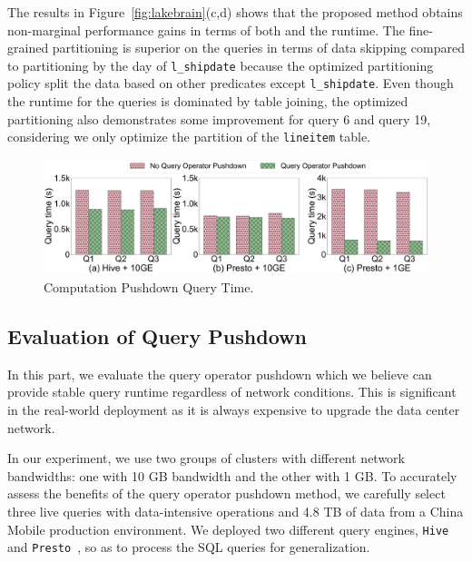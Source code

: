 The results  in Figure~\ref{fig:lakebrain}(c,d) shows that the proposed method obtains non-marginal performance gains in terms of both  and the runtime. The fine-grained partitioning is superior on the queries in terms of data skipping compared to partitioning by the day of \texttt{l\_shipdate} because the optimized partitioning policy split the data based on other predicates except \texttt{l\_shipdate}. Even though the runtime for the queries is dominated by table joining, the optimized partitioning also demonstrates some improvement for query 6 and query 19, considering we only optimize the partition of the \texttt{lineitem} table. 



\begin{figure}
	\centering
	\includegraphics[width=\columnwidth]{figures/Querytime}
	\caption{Computation Pushdown Query Time.}
	\label{fig:pushdown}
\end{figure}



\subsection{Evaluation of Query Pushdown}
In this part, we evaluate the query operator pushdown  which we believe can provide stable query runtime regardless of network conditions. This is significant in the real-world deployment as it is  always expensive to upgrade the data center network. 




In our experiment, we use two groups of clusters with different network bandwidths: one with 10 GB bandwidth and the other with 1 GB. To accurately assess the benefits of the query operator pushdown method, we carefully select three live queries with data-intensive operations and 4.8 TB of data from a China Mobile production environment. We deployed two different query engines, \texttt{Hive}~\cite{hive} and \texttt{Presto}~\cite{presto}, so as to process the SQL queries for generalization.

